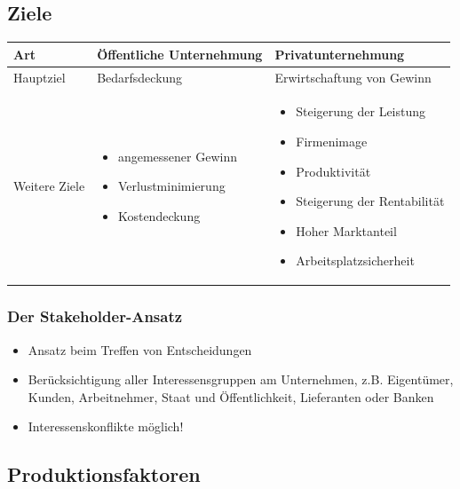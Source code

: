 \documentclass[titlepage,parskip=half]{scrartcl}
\begin{document}
\subsection{Ziele}
\begin{tabularx}{\textwidth}{|l|X|X|} \hline
    Art & Öffentliche Unternehmung & Privatunternehmung \\ \hline
    Hauptziel & Bedarfsdeckung & Erwirtschaftung von Gewinn \\ \hline
Weitere Ziele & 
\begin{itemize}
    \item angemessener Gewinn
    \item Verlustminimierung
    \item Kostendeckung
\end{itemize}
    & 
    \begin{itemize}
        \item Steigerung der Leistung
        \item Firmenimage
        \item Produktivität
        \item Steigerung der Rentabilität
        \item Hoher Marktanteil
        \item Arbeitsplatzsicherheit
    \end{itemize}
    \\ \hline
\end{tabularx}

\subsubsection{Der Stakeholder-Ansatz}
\begin{itemize}
    \item Ansatz beim Treffen von Entscheidungen
    \item Berücksichtigung aller Interessensgruppen am Unternehmen, z.B. Eigentümer, Kunden, Arbeitnehmer, Staat und Öffentlichkeit, Lieferanten oder Banken
    \item Interessenskonflikte möglich!
\end{itemize}

\subsection{Produktionsfaktoren}
\end{document}
